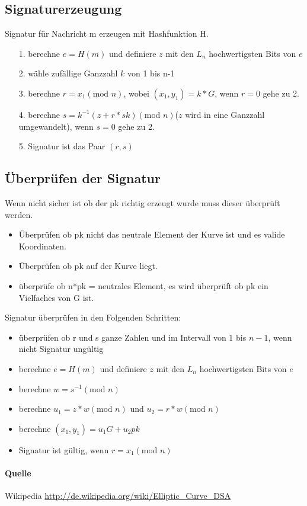 \documentclass{scrartcl}
\begin{document}
\subsection*{Signaturerzeugung}
Signatur für Nachricht m erzeugen mit Hashfunktion H.
\begin{itemize}
\item[1.] berechne $e = H(m)$ und definiere $z$ mit den $L_n$ hochwertigsten Bits von $e$  
\item[2.] wähle zufällige Ganzzahl $k$ von 1 bis n-1
\item[3.] berechne $r = x_1 (\text{mod } n) $, wobei $(x_1, y_1) = k * G$, wenn $r = 0$ gehe zu 2.
\item[4.] berechne $s = k^{-1} ( z + r * sk) (\text{mod } n)$($z$ wird in eine Ganzzahl umgewandelt), wenn $s = 0$ gehe zu 2.
\item[5.] Signatur ist das Paar $(r,s)$
\end{itemize}

\subsection*{Überprüfen der Signatur}
Wenn nicht sicher ist ob der pk richtig erzeugt wurde muss dieser überprüft werden.
\begin{itemize}
\item Überprüfen ob pk nicht das neutrale Element der Kurve ist und es valide Koordinaten.
\item Überprüfen ob pk auf der Kurve liegt.
\item überprüfe ob n*pk = neutrales Element, es wird überprüft ob pk ein Vielfaches von G ist.
\end{itemize}

Signatur überprüfen in den Folgenden Schritten:
\begin{itemize}
\item überprüfen ob r und s ganze Zahlen und im Intervall von $1$ bis $n-1$, wenn nicht Signatur ungültig
\item berechne $e = H(m)$ und definiere $z$ mit den $L_n$ hochwertigsten Bits von $e$
\item berechne $w = s^{-1} (\text{mod } n)$
\item berechne $u_1 = z * w 	(\text{mod } n)$ und $u_2 = r * w (\text{mod } n)$
\item berechne $(x_1,y_1) = u_1 G + u_2 pk$
\item Signatur ist gültig, wenn $r = x_1 (\text{mod } n)$ 
\end{itemize}

\paragraph*{Quelle}
Wikipedia \url{http://de.wikipedia.org/wiki/Elliptic_Curve_DSA}
\end{document}

